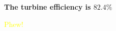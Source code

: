 \documentclass[10pt]{amsart}
\begin{document}
	\begin{center}
		\textbf{The turbine efficiency is $82.4\%$}
	\end{center}

	\textcolor{yellow}{Phew!}





	\vfill


	\newpage
\end{document}
